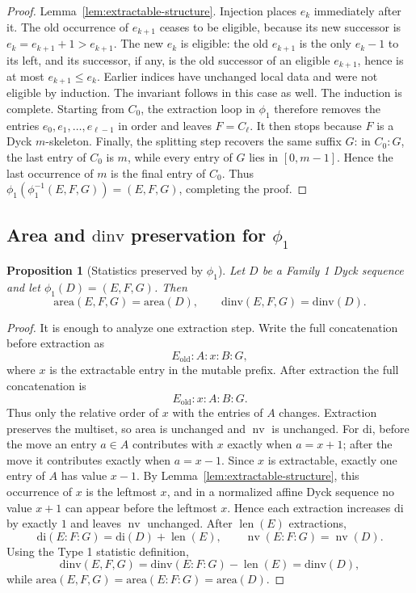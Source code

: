 \documentclass[11pt]{article}
\theoremstyle{plain}
\newtheorem{proposition}[theorem]{Proposition}
\theoremstyle{definition}
\theoremstyle{remark}
\newcommand{\di}{\mathrm{di}}
\newcommand{\dinv}{\mathrm{dinv}}
\newcommand{\area}{\mathrm{area}}
\begin{document}
\begin{proof}
Lemma~\ref{lem:extractable-structure}.  Injection places \(e_k\) immediately
after it.  The old occurrence of \(e_{k+1}\) ceases to be eligible, because its
new successor is \(e_k=e_{k+1}+1>e_{k+1}\).  The new \(e_k\) is eligible: the
old \(e_{k+1}\) is the only \(e_k-1\) to its left, and its successor, if any,
is the old successor of an eligible \(e_{k+1}\), hence is at most
\(e_{k+1}\le e_k\).  Earlier indices have unchanged local data and were not
eligible by induction.  The invariant follows in this case as well.
The induction is complete.  Starting from \(C_0\), the extraction loop in
\(\phi_1\) therefore removes the entries \(e_0,e_1,\ldots,e_{\ell-1}\) in order
and leaves \(F=C_\ell\).  It then stops because \(F\) is a Dyck
\(m\)-skeleton.  Finally, the splitting step recovers the same suffix \(G\): in
\(C_0:G\), the last entry of \(C_0\) is \(m\), while every entry of \(G\) lies
in \([0,m-1]\).  Hence the last occurrence of \(m\) is the final entry of
\(C_0\).  Thus \(\phi_1(\phi_1^{-1}(E,F,G))=(E,F,G)\), completing the proof.
\end{proof}
\subsection{\texorpdfstring{Area and \(\dinv\) preservation for \(\phi_1\)}{Area and dinv preservation for phi1}}
\begin{proposition}[Statistics preserved by \(\phi_1\)]
\label{prop:phi1-statistics}
Let \(D\) be a Family 1 Dyck sequence and let \(\phi_1(D)=(E,F,G)\).  Then
\[
  \area(E,F,G)=\area(D),
  \qquad
  \dinv(E,F,G)=\dinv(D).
\]
\end{proposition}
\begin{proof}
It is enough to analyze one extraction step.  Write the full
concatenation before extraction as
\[
  E_{\mathrm{old}}:A:x:B:G,
\]
where \(x\) is the extractable entry in the mutable prefix.  After extraction
the full concatenation is
\[
  E_{\mathrm{old}}:x:A:B:G.
\]
Thus only the relative order of \(x\) with the entries of \(A\) changes.
Extraction preserves the multiset, so area is unchanged and
\(\operatorname{nv}\) is unchanged.
For \(\di\), before the move an entry \(a\in A\) contributes with \(x\) exactly
when \(a=x+1\); after the move it contributes exactly when \(a=x-1\).  Since
\(x\) is extractable, exactly one entry of \(A\) has value \(x-1\).  By
Lemma~\ref{lem:extractable-structure}, this occurrence of \(x\) is the
leftmost \(x\), and in a normalized affine Dyck sequence no value \(x+1\) can
appear before the leftmost \(x\).  Hence each extraction increases \(\di\) by
exactly \(1\) and leaves \(\operatorname{nv}\) unchanged.  After
\(\operatorname{len}(E)\) extractions,
\[
  \di(E:F:G)=\di(D)+\operatorname{len}(E),
  \qquad
  \operatorname{nv}(E:F:G)=\operatorname{nv}(D).
\]
Using the Type 1 statistic definition,
\[
  \dinv(E,F,G)=\dinv(E:F:G)-\operatorname{len}(E)=\dinv(D),
\]
while \(\area(E,F,G)=\area(E:F:G)=\area(D)\).
\end{proof}
\end{document}
